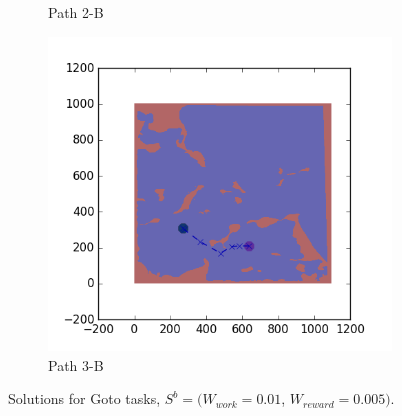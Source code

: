 \documentclass{tamuccthesis}
\begin{document}
\begin{figure}
\begin{subfigure}[b]{0.24\textwidth}
        \caption{Path 2-B}   
        \label{fig:Path_2-B_upReward_upWork_b}
    \end{subfigure}
  \begin{subfigure}[b]{0.24\textwidth}
        \centering
        \includegraphics[width=\textwidth,trim={4cm 3cm 2cm 3cm},clip]{EXP3RG_PathCb_-1_-1_0d01_0d005.png}
        \caption{Path 3-B}    
        \label{fig:Path_3-B_upReward_upWork_b}
    \end{subfigure}
    \caption[Solutions for Goto tasks using weights $S^b$.]{Solutions for Goto tasks, $S^b = (W_{work} = 0.01$, $W_{reward} = 0.005)$.}
    \label{fig:weights_Sb}
\end{figure}
\end{document}
